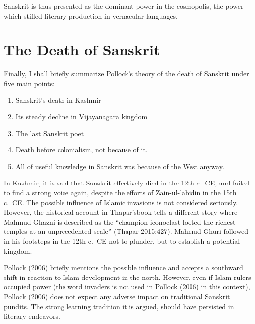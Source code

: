 Sanskrit is thus presented as the dominant power in the cosmopolis, the power which stifled literary production in vernacular languages.
\vskip -10pt

\section{The Death of Sanskrit}
\vskip -3pt

Finally, I shall briefly summarize Pollock’s theory of the death of Sanskrit under five main points:

\begin{enumerate}
\item Sanskrit’s death in Kashmir
\item Its steady decline in Vijayanagara kingdom
\item The last Sanskrit poet
\item Death before colonialism, not because of it. 
\item All of useful knowledge in Sanskrit was because of the West anyway.
\end{enumerate}

In Kashmir, it is said that Sanskrit effectively died in the 12th c.\ CE, and failed to find a strong voice again, despite the efforts of Zain-ul-'abidin in the 15th c.\ CE\@. The possible influence of Islamic invasions is not considered seriously. However, the historical account in Thapar’sbook tells a different story where Mahmud Ghazni is described as the “champion iconoclast looted the richest temples at an unprecedented scale” (Thapar 2015:427). Mahmud Ghuri followed in his footsteps in the 12th c.\ CE not to plunder, but to establish a potential kingdom.
\vskip 1.5pt

Pollock (2006) briefly mentions the possible influence and accepts a southward shift in reaction to Islam development in the north. However, even if Islam rulers occupied power (the word invaders is not used in Pollock (2006) in this context), Pollock (2006) does not expect any adverse impact on traditional Sanskrit pundits. The strong learning tradition it is argued, should have persisted in literary endeavors. 
\vskip 1.5pt

